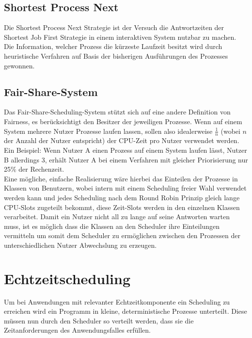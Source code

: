 \subsection{Shortest Process Next}
Die Shortest Process Next Strategie ist der Versuch die Antwortzeiten der Shortest Job First Strategie in einem interaktiven System nutzbar zu machen. Die Information, welcher Prozess die kürzeste Laufzeit besitzt wird durch heuristische Verfahren auf Basis der bisherigen Ausführungen des Prozesses gewonnen.



\subsection{Fair-Share-System}
Das Fair-Share-Scheduling-System stützt sich auf eine andere Definition von Fairness, es berücksichtigt den Besitzer der jeweiligen Prozesse. Wenn auf einem System mehrere Nutzer Prozesse laufen lassen, sollen also idealerweise \(\frac{1}{n}\) (wobei \(n\) der Anzahl der Nutzer entspricht) der CPU-Zeit pro Nutzer verwendet werden. \\
Ein Beispiel: Wenn Nutzer A einen Prozess auf einem System laufen lässt, Nutzer B allerdings 3, erhält Nutzer A bei einem Verfahren mit gleicher Priorisierung nur 25\% der Rechenzeit. \\
Eine mögliche, einfache Realisierung wäre hierbei das Einteilen der Prozesse in Klassen von Benutzern, wobei intern mit einem Scheduling freier Wahl verwendet werden kann und jedes Scheduling nach dem Round Robin Prinzip gleich lange CPU-Slots zugeteilt bekommt, diese Zeit-Slots werden in den einzelnen Klassen verarbeitet. Damit ein Nutzer nicht all zu lange auf seine Antworten warten muss, ist es möglich dass die Klassen an den Scheduler ihre Einteilungen vermitteln um somit dem Scheduler zu ermöglichen zwischen den Prozessen der unterschiedlichen Nutzer Abwechslung zu erzeugen.
\\
\section{Echtzeitscheduling}
Um bei Anwendungen mit relevanter Echtzeitkomponente ein Scheduling zu erreichen wird ein Programm in kleine, deterministische Prozesse unterteilt. Diese müssen nun durch den Scheduler so verteilt werden, dass sie die Zeitanforderungen des Anwendungsfalles erfüllen.

